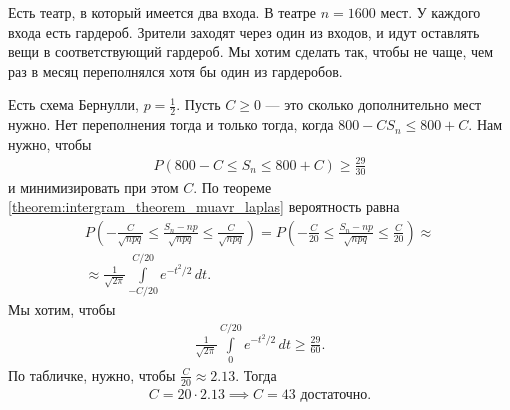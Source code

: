 \begin{exmpl}
 Есть театр, в который имеется два входа. В театре $n=1600$ мест. У каждого входа есть гардероб. Зрители заходят через один из входов, и идут оставлять вещи в соответствующий гардероб. Мы хотим сделать так, чтобы не чаще, чем раз в месяц переполнялся хотя бы один из гардеробов.

 Есть схема Бернулли, $p = \frac{1}{2}$. Пусть $C \geqslant 0$ --- это сколько дополнительно мест нужно. Нет переполнения тогда и только тогда, когда
 $800 - C S_n \leqslant 800 + C$. Нам нужно, чтобы
 \begin{align*}
  P(800 - C \leqslant S_n \leqslant 800 + C) \geqslant \frac{29}{30}
 \end{align*} и минимизировать при этом $C$. По теореме \ref{theorem:intergram_theorem_muavr_laplas} вероятность равна
 \begin{align*}
  P\left(-\frac{C}{\sqrt{npq}} \leqslant \frac{S_n - np}{\sqrt{npq}} \leqslant \frac{C}{\sqrt{npq}}\right) = P \left( -\frac{C}{20} \leqslant \frac{S_n - np}{\sqrt{npq}} \leqslant \frac{C}{20} \right) \approx \\
  \approx \frac{1}{\sqrt{2\pi}} \int\limits_{-C / 20}^{C / 20}  e^{-t^{2} / 2} \, dt.
 \end{align*} Мы хотим, чтобы
 \begin{align*}
  \frac{1}{\sqrt{2\pi}}\int\limits_{0}^{C / 20} e^{-t^{2} / 2} \, dt \geqslant \frac{29}{60}
 .\end{align*} По табличке, нужно, чтобы $\frac{C}{20} \approx 2.13$. Тогда
 \begin{align*}
  C = 20 \cdot 2.13 \implies C = 43 \text{ достаточно.}
 \end{align*} 
\end{exmpl}

